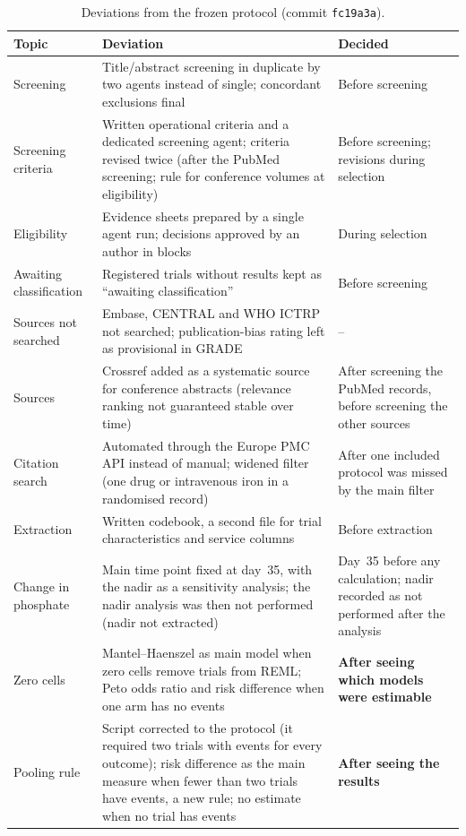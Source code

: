 \documentclass[11pt,a4paper]{article}
\begin{document}
\begin{table}[p]
\centering\footnotesize\setlength{\tabcolsep}{4pt}
\caption{Deviations from the frozen protocol (commit \texttt{fc19a3a}).}\label{tab:deviations}
\begin{tabularx}{\textwidth}{L{3.0cm}Y L{3.2cm}}
\toprule
Topic & Deviation & Decided \\
\midrule
Screening & Title/abstract screening in duplicate by two agents instead of single; concordant exclusions final & Before screening \\
Screening criteria & Written operational criteria and a dedicated screening agent; criteria revised twice (after the PubMed screening; rule for conference volumes at eligibility) & Before screening; revisions during selection \\
Eligibility & Evidence sheets prepared by a single agent run; decisions approved by an author in blocks & During selection \\
Awaiting classification & Registered trials without results kept as ``awaiting classification'' & Before screening \\
Sources not searched & Embase, CENTRAL and WHO ICTRP not searched; publication-bias rating left as provisional in GRADE & -- \\
Sources & Crossref added as a systematic source for conference abstracts (relevance ranking not guaranteed stable over time) & After screening the PubMed records, before screening the other sources \\
Citation search & Automated through the Europe PMC API instead of manual; widened filter (one drug or intravenous iron in a randomised record) & After one included protocol was missed by the main filter \\
Extraction & Written codebook, a second file for trial characteristics and service columns & Before extraction \\
Change in phosphate & Main time point fixed at day~35, with the nadir as a sensitivity analysis; the nadir analysis was then not performed (nadir not extracted) & Day~35 before any calculation; nadir recorded as not performed after the analysis \\
Zero cells & Mantel--Haenszel as main model when zero cells remove trials from REML; Peto odds ratio and risk difference when one arm has no events & \textbf{After seeing which models were estimable} \\
Pooling rule & Script corrected to the protocol (it required two trials with events for every outcome); risk difference as the main measure when fewer than two trials have events, a new rule; no estimate when no trial has events & \textbf{After seeing the results} \\

\end{tabularx}
\end{table}
\end{document}
